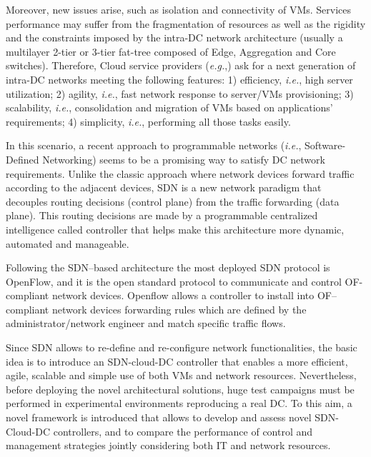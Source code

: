 \documentclass[12pt,english,oneside]{book}
\begin{document}
Moreover, new issues arise, such as isolation and connectivity of VMs.
Services performance may suffer from the fragmentation of resources as well as the rigidity and the constraints imposed by the intra-DC network architecture (usually a multilayer 2-tier or 3-tier fat-tree composed of Edge, Aggregation and Core switches\cite{dc_arch}).
Therefore, Cloud service providers (\textit{e.g.},\cite{amazon}) ask for a next generation of intra-DC networks meeting the following features: 1) efficiency, \textit{i.e.}, high server utilization; 2) agility, \textit{i.e.}, fast network response to server/VMs provisioning; 3) scalability, \textit{i.e.}, consolidation and migration of VMs based on applications' requirements; 4) simplicity, \textit{i.e.}, performing all those tasks easily\cite{baldonado}.

In this scenario, a recent approach to programmable networks (\textit{i.e.}, Software-Defined Networking) seems to be a promising way to satisfy DC network requirements\cite{ibmnec}. 
Unlike the classic approach where network devices forward traffic according to the adjacent devices, SDN is a new network paradigm that decouples routing decisions (control plane) from the traffic forwarding (data plane). This routing decisions are made by a programmable centralized intelligence called controller that helps make this architecture more dynamic, automated and manageable.

Following the SDN--based architecture the most deployed SDN protocol is OpenFlow\cite{openflow}\cite{onf}, and it is the open standard protocol to communicate and control OF-compliant network devices.
Openflow allows a controller to install into OF--compliant network devices forwarding rules which are defined by the administrator/network engineer and match specific traffic flows.

Since SDN allows to re-define and re-configure network functionalities, the basic idea is to introduce an SDN-cloud-DC controller that enables a more efficient, agile, scalable and simple use of both VMs and network resources.
Nevertheless, before deploying the novel architectural solutions, huge test campaigns must be performed in experimental environments reproducing a real DC.
To this aim, a novel framework is introduced that allows to develop and assess novel SDN-Cloud-DC controllers, and to compare the performance of control and management strategies jointly considering both IT and network resources\cite{im2013}.

\end{document}
